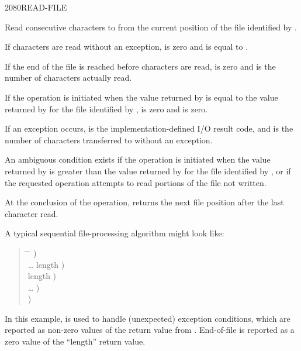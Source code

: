 \begin{worddef}{2080}{READ-FILE}
\item {}

	Read  consecutive characters to  from the
	current position of the file identified by .

	If  characters are read without an exception, 
	is zero and  is equal to .

	If the end of the file is reached before  characters are
	read,  is zero and  is the number of characters
	actually read.

	If the operation is initiated when the value returned by
	 is equal to the value returned by
	 for the file identified by ,
	 is zero and  is zero.

	If an exception occurs,  is the implementation-defined
	I/O result code, and  is the number of characters
	transferred to  without an exception.

	An ambiguous condition exists if the operation is initiated when
	the value returned by  is greater than the
	value returned by  for the file identified by
	, or if the requested operation attempts to read
	portions of the file not written.

	At the conclusion of the operation,  returns
	the next file position after the last character read.

	\begin{defer}
	\rationale %
		A typical sequential file-processing algorithm might look like:
		\begin{quote}\ttfamily{}
			\begin{tabbing}
			\tab \= \hspace{12em} \= \kill
								\>\>  ) \\
			\> {\ldots}  
											\>	  length ) \\
			 		\>\> \word{p} length ) \\
			\> {\ldots}						\>	  ) \\
								\>\>  )
			\end{tabbing}
		\end{quote}

		In this example,  is used to handle
		(unexpected) exception conditions, which are reported as
		non-zero values of the  return value from
		. End-of-file is reported as a zero value of
		the ``length'' return value.
	\end{defer}
\end{worddef}


